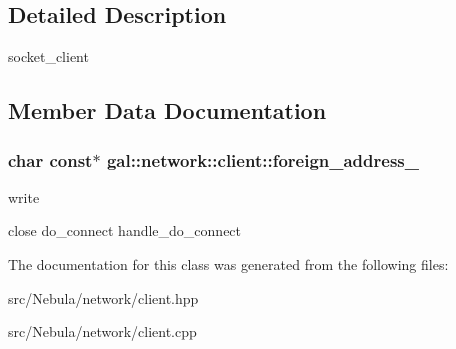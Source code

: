 \subsection{\-Detailed \-Description}
socket\-\_\-client 

\subsection{\-Member \-Data \-Documentation}
\hypertarget{classgal_1_1network_1_1client_a50f554a8893793fdd9e0a2d53b79f60e}{
\subsubsection[{foreign\-\_\-address\-\_\-}]{\setlength{\rightskip}{0pt plus 5cm}char const$\ast$ {\bf gal\-::network\-::client\-::foreign\-\_\-address\-\_\-}}}\label{classgal_1_1network_1_1client_a50f554a8893793fdd9e0a2d53b79f60e}


write 

close do\-\_\-connect handle\-\_\-do\-\_\-connect 

\-The documentation for this class was generated from the following files\-:\begin{DoxyCompactItemize}
\item 
src/\-Nebula/network/client.\-hpp\item 
src/\-Nebula/network/client.\-cpp\end{DoxyCompactItemize}
